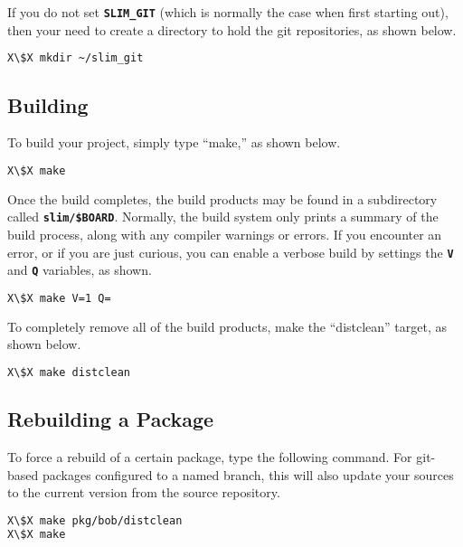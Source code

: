 \documentclass[a4paper,10pt]{article}
\newcommand{\fw}{\tt\bf}
\begin{document}
    If you do not set {\fw SLIM\_GIT} (which is normally the case when
    first starting out), then your need to create a directory to hold
    the git repositories, as shown below.

\begin{lstlisting}[language=bash,escapechar=X]
X\$X mkdir ~/slim_git
\end{lstlisting}

\subsection{Building} \label{Building}

    To build your project, simply type ``make,'' as shown below.

\begin{lstlisting}[language=bash,escapechar=X]
X\$X make
\end{lstlisting}

    Once the build completes, the build products may be found in a
    subdirectory called {\fw slim/\$BOARD}. Normally, the build system
    only prints a summary of the build process, along with any
    compiler warnings or errors. If you encounter an error, or if you
    are just curious, you can enable a verbose build by settings the
    {\fw V} and {\fw Q} variables, as shown.

\begin{lstlisting}[language=bash,escapechar=X]
X\$X make V=1 Q=
\end{lstlisting}

    To completely remove all of the build products, make the
    ``distclean'' target, as shown below.

\begin{lstlisting}[language=bash,escapechar=X]
X\$X make distclean
\end{lstlisting}

\subsection{Rebuilding a Package}

    To force a rebuild of a certain package, type the following
    command. For git-based packages configured to a named branch, this
    will also update your sources to the current version from the
    source repository.

\begin{lstlisting}[language=bash,escapechar=X]
X\$X make pkg/bob/distclean
X\$X make
\end{lstlisting}
\end{document}
